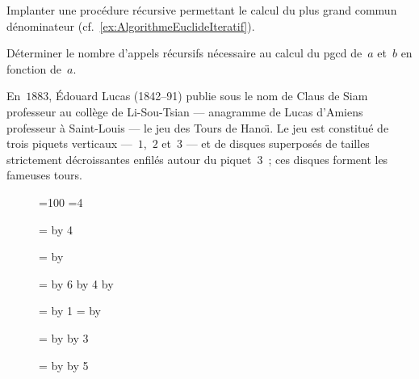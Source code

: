 \begin{exercice}
  Implanter une proc\'edure  r\'ecursive permettant le  calcul du plus
  grand commun d\'enominateur (cf.~\ref{ex:AlgorithmeEuclideIteratif}).
  \ifcorrection
  \begin{correction}
    
  \end{correction}
  \fi
  D\'eterminer le  nombre d'appels r\'ecursifs n\'ecessaire  au calcul
  du pgcd de~$a$ et~$b$ en fonction de~$a$.
\end{exercice}
\begin{exercice}
\label{sec:TourDeHanoi}
En~$1883$, \'Edouard Lucas (1842--91) publie sous le nom de Claus de
Siam  professeur au coll\`ege de Li-Sou-Tsian  ---  anagramme de Lucas
d'Amiens    professeur  \`a Saint-Louis  ---    le   jeu des Tours  de
Hano\"\i{}.    Le  jeu est  constitu\'e   de  trois  piquets verticaux
---~$1$,~$2$ et~$3$ ---     et  de disques superpos\'es   de   tailles
strictement   d\'ecroissantes  enfil\'es autour  du  piquet~$3$~;  ces
disques forment les fameuses tours.
\begin{figure}[htbp]      %
  \begin{center}
    =100                 %
    =4                  %

    =            %
    \advance{} by 4       %

    =
    \divide{} by   %

    =            %
    \multiply{} by 6     
    \advance{} by 4    
    \multiply{} by  %

    =
    \advance{} by 1 
    =
    \multiply{} by   %

    = 
    \multiply{} by         
    \multiply{} by 3        %

    = 
    \multiply{} by         
    \multiply{} by 5        %


\end{center}
\end{figure}
\end{exercice}
